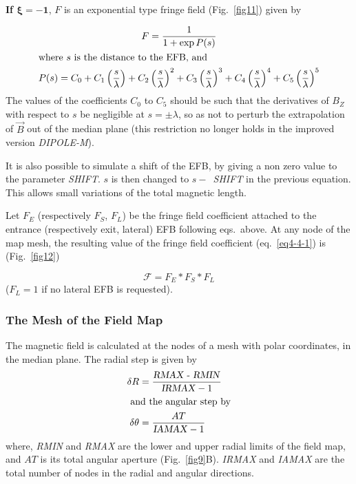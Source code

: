 \noindent\textbf{If $\mathbf{\xi  = -1}$},  $ F $ is an exponential type
fringe field (Fig.~\ref{fig11}) given by~\cite{Biblio12}  %

 \begin{gather}
	 F = \dfrac{1 }{ 1+ \exp  P(s)}
 	\label{eq4-4-4} \\
\intertext{where $ s $ is the distance to the EFB, and }
    P(s) = C_0
       +C_1 \left(  \dfrac{s }{ \lambda} \right) 
       +C_2 \left( \dfrac{s }{ \lambda} \right)^2 
       + C_3 \left( \dfrac{s }{ \lambda} \right)^3 
       +C_4 \left( \dfrac{s }{ \lambda} \right)^4 
       + C_5 \left(\dfrac{s }{ \lambda} \right)^5 \label{eq4-4-5}
\end{gather}
%
The values of the coefficients $ C_0 $ to $ C_5 $ should be such that the 
derivatives of $ B_Z$ with respect to $ s $ be negligible at $ s=\pm \lambda $, so as not
to perturb the extrapolation of $ \vec B $ out of the median plane  (this restriction 
no longer holds in the improved version \textsl{DIPOLE-M}).  

\noindent It is also possible to simulate a shift of the EFB, by giving a non
zero value to the parameter \textsl{SHIFT}.  $ s $ is then changed to $ s  -$~\textsl{SHIFT} in the 
previous equation.   This allows small variations of the total 
magnetic length. 

\noindent Let $ F_E $ (respectively $ F_S$, $F_L$)   be the fringe field
coefficient attached to the entrance (respectively exit, lateral) EFB following eqs.\ above. At any
node of the map mesh, the resulting value of the fringe field coefficient (eq.~\ref{eq4-4-1}) is 
(Fig.~\ref{fig12})  

$$ \mathcal{F}= F_E \ast  F_S \ast  F_L $$
%
 ($F_L=1 $ if no lateral EFB is requested). 

\subsubsection*{The Mesh of the Field Map} 

The magnetic field is calculated at the nodes of a mesh with polar
coordinates, in the median plane.  The radial step is given by 
 \begin{align*}
	 \delta R & = \dfrac{\text{\textsl{RMAX - RMIN}} }{\text{\textsl{IRMAX}}-1} \\
\intertext{ and the angular step by} 
	\delta \theta  & = \dfrac{AT }{ \text{\textsl{IAMAX}}-1} 
 \end{align*}
%
\noindent where, \textsl{RMIN} and  \textsl{RMAX}   are the lower and upper
radial limits of the field map, and $ AT $ is its total angular aperture (Fig.~\ref{fig9}B).  
 \textsl{IRMAX} and  \textsl{IAMAX} are the total number of nodes in the radial and 
 angular directions. 
 

